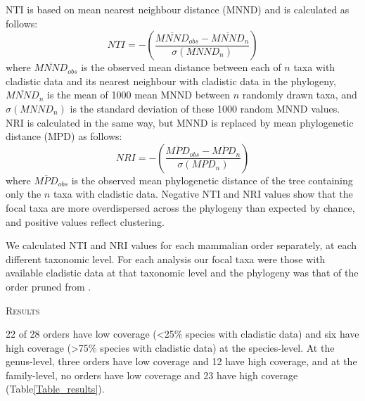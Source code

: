 \documentclass[12pt,letterpaper]{article}
\renewcommand{\section}[1]{%
\bigskip
\begin{center}
\begin{Large}
\normalfont\scshape #1
\medskip
\end{Large}
\end{center}}
\begin{document}
NTI \cite{webb2002phylogenies} is based on mean nearest neighbour distance (MNND) and is calculated as follows:
  \begin{equation}
    NTI=-\left(\frac{\overline{MNND}_{obs}-\overline{MNND}_{n}}{\sigma(MNND_{n})}\right)
  \end{equation}
where $\overline{MNND}_{obs}$ is the observed mean distance between each of $n$ taxa with cladistic data and its nearest neighbour with cladistic data in the phylogeny, 
$\overline{MNND}_{n}$ is the mean of 1000 mean MNND between $n$ randomly drawn taxa, and $\sigma(MNND_{n})$ is the standard deviation of these 1000 random MNND values.
NRI is calculated in the same way, but MNND is replaced by mean phylogenetic distance (MPD) as follows:
  \begin{equation}
    NRI=-\left(\frac{\overline{MPD}_{obs}-\overline{MPD}_{n}}{\sigma(MPD_{n})}\right)
  \end{equation}
where $\overline{MPD}_{obs}$ is the observed mean phylogenetic distance of the tree containing only the $n$ taxa with cladistic data.
Negative NTI and NRI values show that the focal taxa are more overdispersed across the phylogeny than expected by chance, and positive values reflect clustering.

We calculated NTI and NRI values for each mammalian order separately, at each different taxonomic level. 
For each analysis our focal taxa were those with available cladistic data at that taxonomic level and the phylogeny was that of the order pruned from \cite{BinindaEmonds}.

%
%


\section{Results}
22 of 28 orders have low coverage (\textless 25\% species with cladistic data) and six have high coverage (\textgreater 75\% species with cladistic data) at the species-level.
At the genus-level, three orders have low coverage and 12 have high coverage, and at the family-level, no orders have low coverage and 23 have high coverage (Table\ref{Table_results}).

\end{document}
